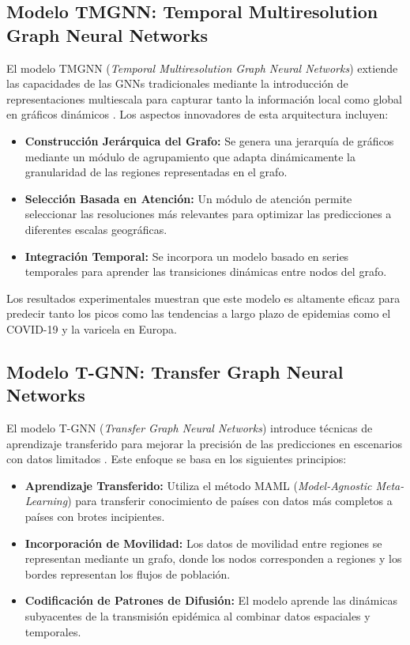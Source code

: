 \subsection{Modelo TMGNN: Temporal Multiresolution Graph Neural Networks}

El modelo TMGNN (\textit{Temporal Multiresolution Graph Neural Networks}) extiende las capacidades de las GNNs tradicionales mediante la introducción de representaciones multiescala para capturar tanto la información local como global en gráficos dinámicos \cite{172}. Los aspectos innovadores de esta arquitectura incluyen:

\begin{itemize}
    \item \textbf{Construcción Jerárquica del Grafo:} Se genera una jerarquía de gráficos mediante un módulo de agrupamiento que adapta dinámicamente la granularidad de las regiones representadas en el grafo.
    \item \textbf{Selección Basada en Atención:} Un módulo de atención permite seleccionar las resoluciones más relevantes para optimizar las predicciones a diferentes escalas geográficas.
    \item \textbf{Integración Temporal:} Se incorpora un modelo basado en series temporales para aprender las transiciones dinámicas entre nodos del grafo.
\end{itemize}

Los resultados experimentales muestran que este modelo es altamente eficaz para predecir tanto los picos como las tendencias a largo plazo de epidemias como el COVID-19 y la varicela en Europa.

\subsection{Modelo T-GNN: Transfer Graph Neural Networks}

El modelo T-GNN (\textit{Transfer Graph Neural Networks}) introduce técnicas de aprendizaje transferido para mejorar la precisión de las predicciones en escenarios con datos limitados \cite{173}. Este enfoque se basa en los siguientes principios:

\begin{itemize}
    \item \textbf{Aprendizaje Transferido:} Utiliza el método MAML (\textit{Model-Agnostic Meta-Learning}) para transferir conocimiento de países con datos más completos a países con brotes incipientes.
    \item \textbf{Incorporación de Movilidad:} Los datos de movilidad entre regiones se representan mediante un grafo, donde los nodos corresponden a regiones y los bordes representan los flujos de población.
    \item \textbf{Codificación de Patrones de Difusión:} El modelo aprende las dinámicas subyacentes de la transmisión epidémica al combinar datos espaciales y temporales.
\end{itemize}


